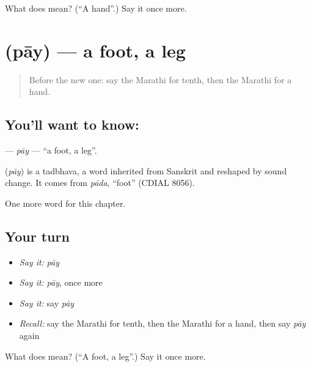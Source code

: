 \begin{tcolorbox}[breakable,colback=teal!4,colframe=teal!35!black,title={Before you move on}]
What does  mean? (\textquotedblleft{}A hand\textquotedblright{}.) Say it once more.
\end{tcolorbox}
\section[\texorpdfstring{\mr{पाय} (pāy)}{पाय (pāy)}]{ (pāy) — a foot, a leg}

\label{lesson:MR-C70-pay}



\begin{quote}
Before the new one: say the Marathi for tenth, then the Marathi for a hand.
\end{quote}

\subsection*{You'll want to know: }
\textbf{} — \emph{pāy} — \textquotedblleft{}a foot, a leg\textquotedblright{}.

\begin{cousinweb}
\textbf{} (\emph{pāy}) is a tadbhava, a word inherited from Sanskrit and reshaped by sound change. It comes from \emph{pāda}, \textquotedblleft{}foot\textquotedblright{} (CDIAL 8056).
\end{cousinweb}

\begin{grammarlens}[title={What you've built}]
One more word for this chapter.
\end{grammarlens}

\subsection*{Your turn}
\begin{itemize}
\raggedright
  \item \emph{Say it:} \emph{pāy}
  \item \emph{Say it:} \emph{pāy}, once more
  \item \emph{Say it:} say \emph{pāy}
  \item \emph{Recall:} say the Marathi for tenth, then the Marathi for a hand, then say \emph{pāy} again
\end{itemize}

\begin{tcolorbox}[breakable,colback=teal!4,colframe=teal!35!black,title={Before you move on}]
What does  mean? (\textquotedblleft{}A foot, a leg\textquotedblright{}.) Say it once more.
\end{tcolorbox}
